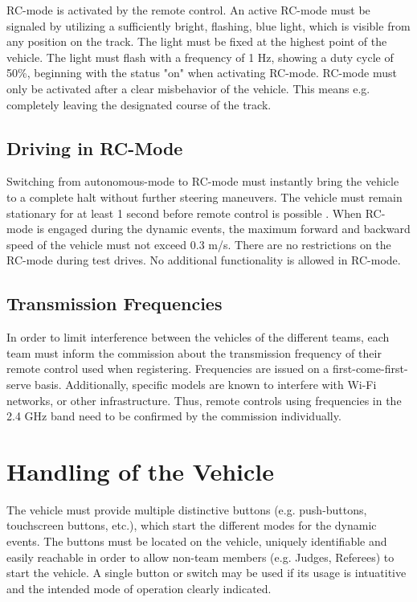 RC-mode is activated by the remote control. An active RC-mode must be signaled
by utilizing a sufficiently bright, flashing, blue light, which is visible from
any position on the track. The light must be fixed at the highest point of the
vehicle. The light must flash with a frequency of 1 Hz, showing a duty cycle of
50\%, beginning with the status "on" when activating RC-mode. RC-mode must only
be activated after a clear misbehavior of the vehicle. This means e.g.
completely leaving the designated course of the track.

\subsection{Driving in RC-Mode}

Switching from autonomous-mode to RC-mode must instantly bring the vehicle to a 
complete halt without further steering maneuvers. The vehicle must remain 
stationary for at least 1 second before remote control is possible 
. When RC-mode 
is engaged during the dynamic events, the maximum forward and backward speed of 
the vehicle must not exceed 0.3 m/s. There are no restrictions on the RC-mode 
during test drives. No additional functionality is allowed in RC-mode.

\subsection{Transmission Frequencies}

In order to limit interference between the vehicles of the different teams,
each team must inform the commission about the transmission frequency of their
remote control used when registering. Frequencies are issued on a
first-come-first-serve basis. Additionally, specific models are known to
interfere with Wi-Fi networks, or other infrastructure. Thus, remote controls
using frequencies in the 2.4 GHz band need to be confirmed by the commission
individually.

\section{Handling of the Vehicle}
\label{handling_vehicle}

\begin{highlight}
    The vehicle must provide multiple distinctive buttons (e.g.
    push-buttons, touchscreen buttons, etc.), which start the different modes for the dynamic events. The buttons must be located on the vehicle,
    uniquely identifiable and easily reachable in order to allow non-team members (e.g. Judges, Referees) to start the vehicle. A single button or switch may be used if its usage is intuatitive and the intended mode of operation clearly indicated.
\end{highlight}

